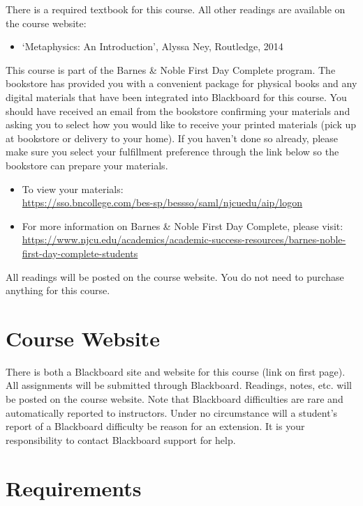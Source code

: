 \documentclass[article,oneside]{memoir}
\begin{document}
There is a required textbook for this course. All other readings are available on the course website:
\begin{itemize}
\item `Metaphysics: An Introduction', Alyssa Ney, Routledge, 2014
\end{itemize}
This course is part of the Barnes \& Noble First Day Complete program.  The bookstore has provided you with a convenient package for physical books and any digital materials that have been integrated into Blackboard for this course. 
You should have received an email from the bookstore confirming your materials and asking you to select how you would like to receive your printed materials (pick up at bookstore or delivery to your home). If you haven't done so already, please make sure you select your fulfillment preference through the link below so the bookstore can prepare your materials.\begin{itemize}

\item To view your materials: \\ \href{https://sso.bncollege.com/bes-sp/bessso/saml/njcuedu/aip/logon}{https://sso.bncollege.com/bes-sp/bessso/saml/njcuedu/aip/logon}
\item For more information on Barnes \& Noble First Day Complete, please visit: \\ \href{https://www.njcu.edu/academics/academic-success-resources/barnes-noble-first-day-complete-students}{https://www.njcu.edu/academics/academic-success-resources/barnes-noble-first-day-complete-students}   
\end{itemize}
All readings will be posted on the course website. You do not need to purchase anything for this course. 


\section{Course Website}

There is both a Blackboard site and website for this course (link on first page). All assignments will be submitted through Blackboard. Readings, notes, etc. will be posted on the course website. Note that Blackboard difficulties are rare and automatically reported to instructors. Under no circumstance will a student's report of a Blackboard difficulty be reason for an extension. It is your responsibility to contact Blackboard support for help.


\section{Requirements}
\end{document}
